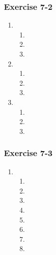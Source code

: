 \begin{multicols}{3}
\subsubsection*{Exercise 7-2} %
\begin{enumerate}[noitemsep, label=\textbf{\arabic*}. ] 
\item %
\begin{enumerate}[noitemsep, label=\textbf{(\alph*)} ]
\item %
\item %
\item %
\end{enumerate}

\item %
\begin{enumerate}[noitemsep, label=\textbf{(\alph*)} ]
\item %
\item %
\item %
\end{enumerate}

\item %
\begin{enumerate}[noitemsep, label=\textbf{(\alph*)} ]
\item %
\item %
\item %
\end{enumerate}
\end{enumerate}
\subsubsection*{Exercise 7-3} %
\begin{enumerate}[noitemsep, label=\textbf{\arabic*}. ]
\item %
      \begin{enumerate}[noitemsep, label=\textbf{(\alph*)} ]
       \item 
\item
\item
\item
\item
\item
\item
\item
      \end{enumerate}



\end{enumerate}
\end{multicols}
